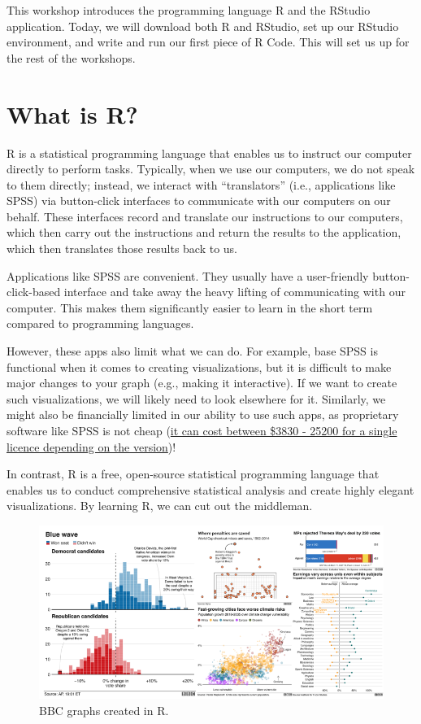 \documentclass[
]{book}
\begin{document}
This workshop introduces the programming language R and the RStudio application. Today, we will download both R and RStudio, set up our RStudio environment, and write and run our first piece of R Code. This will set us up for the rest of the workshops.

\hypertarget{what-is-r}{%
\section{What is R?}\label{what-is-r}}

R is a statistical programming language that enables us to instruct our computer directly to perform tasks. Typically, when we use our computers, we do not speak to them directly; instead, we interact with ``translators'' (i.e., applications like SPSS) via button-click interfaces to communicate with our computers on our behalf. These interfaces record and translate our instructions to our computers, which then carry out the instructions and return the results to the application, which then translates those results back to us.

Applications like SPSS are convenient. They usually have a user-friendly button-click-based interface and take away the heavy lifting of communicating with our computer. This makes them significantly easier to learn in the short term compared to programming languages.

However, these apps also limit what we can do. For example, base SPSS is functional when it comes to creating visualizations, but it is difficult to make major changes to your graph (e.g., making it interactive). If we want to create such visualizations, we will likely need to look elsewhere for it. Similarly, we might also be financially limited in our ability to use such apps, as proprietary software like SPSS is not cheap (\href{https://www.ibm.com/products/spss-statistics/pricing}{it can cost between \$3830 - 25200 for a single licence depending on the version})!

In contrast, R is a free, open-source statistical programming language that enables us to conduct comprehensive statistical analysis and create highly elegant visualizations. By learning R, we can cut out the middleman.

\begin{figure}
\centering
\includegraphics{img/01-bbc.png}
\caption{\label{fig:unnamed-chunk-1}BBC graphs created in R.}
\end{figure}
\end{document}
